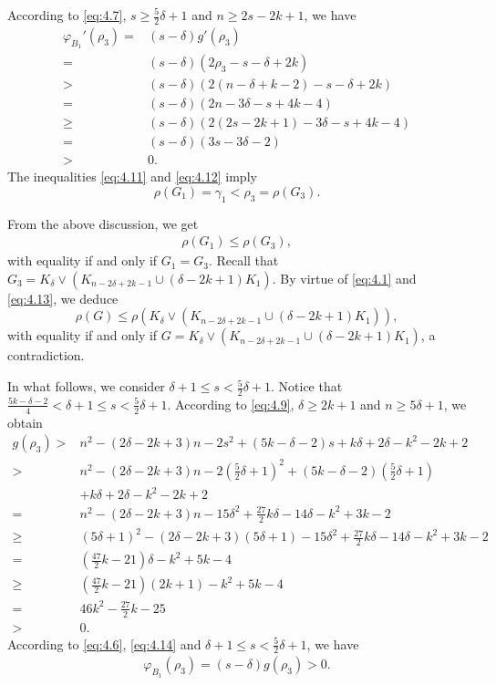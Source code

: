 \documentclass[10pt]{article}
\numberwithin{equation}{section}
\begin{document}
According to \eqref{eq:4.7}, $s\geq\frac{5}{2}\delta+1$ and $n\geq2s-2k+1$, we have
\begin{align}\label{eq:4.12}
\varphi_{B_1}'(\rho_3)=&(s-\delta)g'(\rho_3)\nonumber\\
=&(s-\delta)(2\rho_3-s-\delta+2k)\nonumber\\
>&(s-\delta)(2(n-\delta+k-2)-s-\delta+2k)\nonumber\\
=&(s-\delta)(2n-3\delta-s+4k-4)\nonumber\\
\geq&(s-\delta)(2(2s-2k+1)-3\delta-s+4k-4)\nonumber\\
=&(s-\delta)(3s-3\delta-2)\nonumber\\
>&0.
\end{align}
The inequalities \eqref{eq:4.11} and \eqref{eq:4.12} imply
$$
\rho(G_1)=\gamma_1<\rho_3=\rho(G_3).
$$

From the above discussion, we get
\begin{align}\label{eq:4.13}
\rho(G_1)\leq\rho(G_3),
\end{align}
with equality if and only if $G_1=G_3$. Recall that $G_3=K_{\delta}\vee(K_{n-2\delta+2k-1}\cup(\delta-2k+1)K_1)$. By virtue of \eqref{eq:4.1}
and \eqref{eq:4.13}, we deduce
$$
\rho(G)\leq\rho(K_{\delta}\vee(K_{n-2\delta+2k-1}\cup(\delta-2k+1)K_1)),
$$
with equality if and only if $G=K_{\delta}\vee(K_{n-2\delta+2k-1}\cup(\delta-2k+1)K_1)$, a contradiction.

In what follows, we consider $\delta+1\leq s<\frac{5}{2}\delta+1$. Notice that $\frac{5k-\delta-2}{4}<\delta+1\leq s<\frac{5}{2}\delta+1$.
According to \eqref{eq:4.9}, $\delta\geq2k+1$ and $n\geq5\delta+1$, we obtain
\begin{align}\label{eq:4.14}
g(\rho_3)>&n^{2}-(2\delta-2k+3)n-2s^{2}+(5k-\delta-2)s+k\delta+2\delta-k^{2}-2k+2\nonumber\\
>&n^{2}-(2\delta-2k+3)n-2\left(\frac{5}{2}\delta+1\right)^{2}+(5k-\delta-2)\left(\frac{5}{2}\delta+1\right)\nonumber\\
&+k\delta+2\delta-k^{2}-2k+2\nonumber\\
=&n^{2}-(2\delta-2k+3)n-15\delta^{2}+\frac{27}{2}k\delta-14\delta-k^{2}+3k-2\nonumber\\
\geq&(5\delta+1)^{2}-(2\delta-2k+3)(5\delta+1)-15\delta^{2}+\frac{27}{2}k\delta-14\delta-k^{2}+3k-2\nonumber\\
=&\left(\frac{47}{2}k-21\right)\delta-k^{2}+5k-4\nonumber\\
\geq&\left(\frac{47}{2}k-21\right)(2k+1)-k^{2}+5k-4\nonumber\\
=&46k^{2}-\frac{27}{2}k-25\nonumber\\
>&0.
\end{align}
According to \eqref{eq:4.6}, \eqref{eq:4.14} and $\delta+1\leq s<\frac{5}{2}\delta+1$, we have
\begin{align}\label{eq:4.15}
\varphi_{B_1}(\rho_3)=(s-\delta)g(\rho_3)>0.
\end{align}
\end{document}

